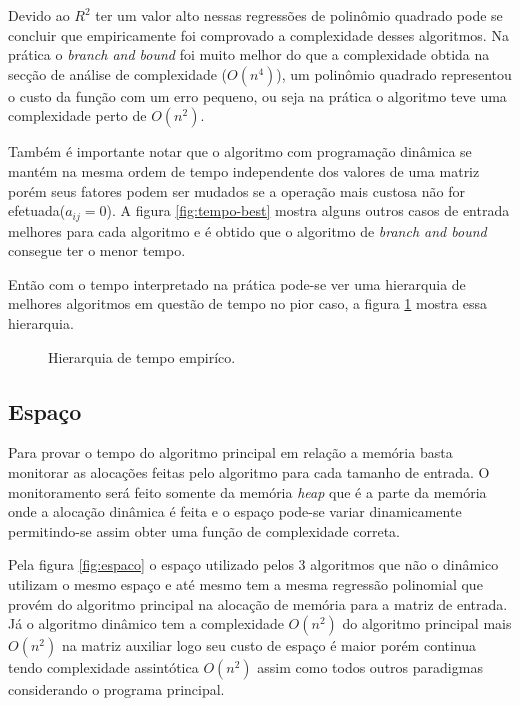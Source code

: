 \documentclass[10.9pt]{article}
\begin{document}
Devido ao \(R^2\) ter um valor alto nessas regressões de polinômio quadrado pode se concluir que empiricamente foi comprovado a complexidade desses algoritmos. Na prática o \emph{branch and bound} foi muito melhor do que a complexidade obtida na secção de análise de complexidade (\(O(n^4)\)), um polinômio quadrado representou o custo da função com um erro pequeno, ou seja na prática o algoritmo teve uma complexidade perto de \(O(n^2)\).

Também é importante notar que o algoritmo com programação dinâmica se mantém na mesma ordem de tempo independente dos valores de uma matriz porém seus fatores podem ser mudados se a operação mais custosa não for efetuada(\(a_{ij}=0\)). A figura \ref{fig:tempo-best} mostra alguns outros casos de entrada melhores para cada algoritmo e é obtido que o algoritmo de \emph{branch and bound} consegue ter o menor tempo.

Então com o tempo interpretado na prática pode-se ver uma hierarquia de melhores algoritmos em questão de tempo no pior caso, a figura \ref{fig:hierarquiaemp} mostra essa hierarquia.

\begin{figure}
\centering
{}
\caption{Hierarquia de tempo empiríco.}\label{fig:hierarquiaemp}
\end{figure}
\subsection{Espaço}
\label{sec:org98b5d17}
Para provar o tempo do algoritmo principal em relação a memória basta monitorar as alocações feitas pelo algoritmo para cada tamanho de entrada. O monitoramento será feito somente da memória \emph{heap} \cite{osthreeeasypieces} que é a parte da memória onde a alocação dinâmica é feita e o espaço pode-se variar dinamicamente permitindo-se assim obter uma função de complexidade correta.

Pela figura \ref{fig:espaco} o espaço utilizado pelos 3 algoritmos que não o dinâmico utilizam o mesmo espaço e até mesmo tem a mesma regressão polinomial que provém do algoritmo principal na alocação de memória para a matriz de entrada. Já o algoritmo dinâmico tem a complexidade \(O(n^2)\) do algoritmo principal mais \(O(n^2)\) na matriz auxiliar logo seu custo de espaço é maior porém continua tendo complexidade assintótica \(O(n^2)\) assim como todos outros paradigmas considerando o programa principal.
\end{document}
